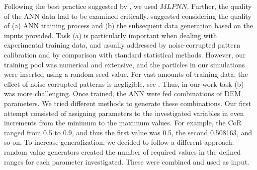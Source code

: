 Following the best practice suggested by \citet{RefWorks:150}, we
used $MLPNN$.
Further, the quality of the \acs{ANN} data had to be examined critically. 
\citet{RefWorks:158} 
suggested considering the quality of (a) \acs{ANN} training process and (b) the
subsequent data generation based on the inputs provided.
Task (a) is particularly important
when dealing with experimental training data, and
usually addressed
by noise-corrupted pattern calibration
and by comparison with standard statistical methods.
However, our training pool was numerical and extensive, 
and the particles in our simulations were inserted using a random
seed value.
For vast amounts of training data, the effect of noise-corrupted patterns is
negligible, see \citet{RefWorks:158}.
Thus, in our work task (b) was more challenging.
Once trained, the \acs{ANN} were fed
combinations of \acs{DEM} parameters. 
We tried different methods to generate these combinations. 
Our first attempt consisted of assigning parameters to the investigated
variables in even increments from the minimum to the maximum values. 
For example, the \acs{CoR} ranged from 0.5 to 0.9, and thus the first value was
0.5, the second 0.508163, and so on.
To increase generalization, we decided to follow a different approach: 
random value generators created the number of required values in the defined
ranges for each parameter investigated.
These were combined and used as input.\\
